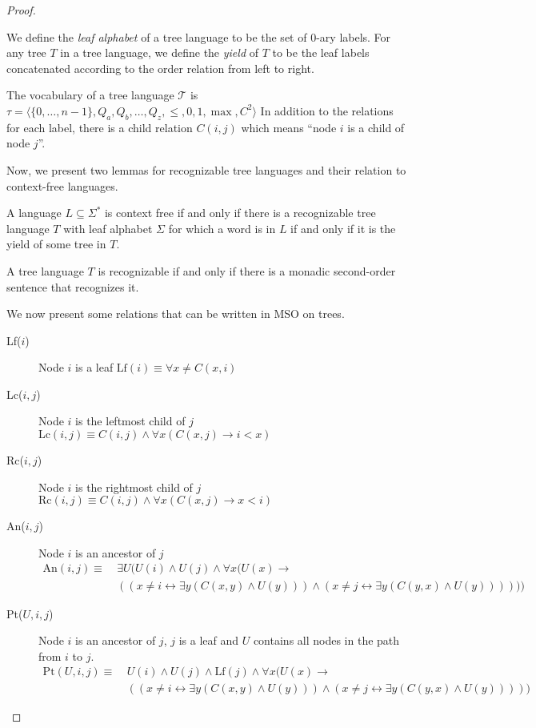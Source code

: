 \begin{proof}
\begin{define}
        We define the \emph{leaf alphabet} of a tree language to be the set of $0$-ary labels.
        For any tree $T$ in a tree language, we define the \emph{yield} of $T$ to be the leaf labels concatenated according to the order relation from left to right.

        The vocabulary of a tree language $\mathcal{T}$ is $\tau = \langle \{0, \dots, n - 1\}, Q_a, Q_b, \dots, Q_z, \leq , 0, 1, \max , C^2 \rangle$
        In addition to the relations for each label, there is a child relation $C(i, j)$ which means ``node $i$ is a child of node $j$''.
    \end{define}

    Now, we present two lemmas for recognizable tree languages and their relation to context-free languages.
    \begin{lemma}
        A language $L \subseteq \Sigma^{*}$ is context free if and only if there is a recognizable tree language $T$ with leaf alphabet $\Sigma$ for which a word is in $L$ if and only if it is the yield of some tree in $T$.
    \end{lemma}

    \begin{lemma}
        A tree language $T$ is recognizable if and only if there is a monadic second-order sentence that recognizes it.
    \end{lemma}

    We now present some relations that can be written in \acs{MSO} on trees.
    \begin{description}
        \item[Lf($i$)] Node $i$ is a leaf $\text{Lf}(i) \equiv \forall x \neq C(x, i)$
        \item[Lc($i, j$)] Node $i$ is the leftmost child of $j$ $\text{Lc}(i, j) \equiv C(i, j) \land \forall x (C(x, j) \to i < x)$
        \item[Rc($i, j$)] Node $i$ is the rightmost child of $j$ $\text{Rc}(i, j) \equiv C(i, j) \land \forall x (C(x, j) \to x < i)$
        \item[An($i, j$)] Node $i$ is an ancestor of $j$
        \begin{align*}
            \text{An}(i, j) \equiv~&\exists U (U(i) \land U(j) \land \forall x (U(x) \to \\
            &((x \neq i \leftrightarrow \exists y (C(x, y) \land U(y))) \land (x \neq j \leftrightarrow \exists y (C(y, x) \land U(y))))))
        \end{align*}
        \item[Pt($U, i, j$)] Node $i$ is an ancestor of $j$, $j$ is a leaf and $U$ contains all nodes in the path from $i$ to $j$.
        \begin{align*}
            \text{Pt}(U, i, j) \equiv~&U(i) \land U(j) \land \text{Lf}(j) \land \forall x (U(x) \to \\
            &((x \neq i \leftrightarrow \exists y (C(x, y) \land U(y))) \land (x \neq j \leftrightarrow \exists y (C(y, x) \land U(y)))))
        \end{align*}
    \end{description}


\end{proof}
